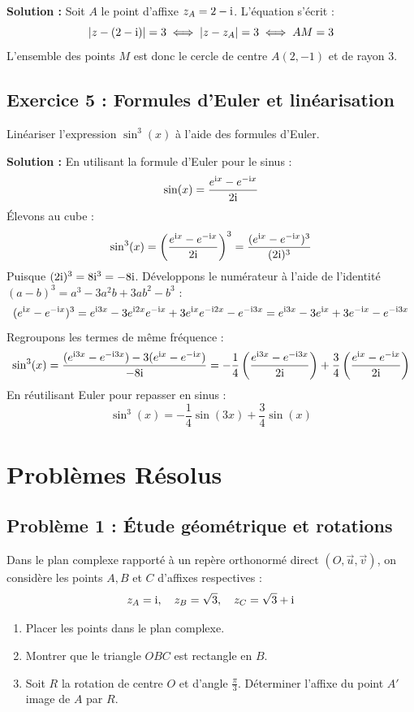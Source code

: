 \textbf{Solution :}
Soit $A$ le point d'affixe $z_A = 2 - \mathrm{i}$.
L'équation s'écrit :
\[
|z - (2 - \mathrm{i})| = 3 \iff |z - z_A| = 3 \iff AM = 3
\]
L'ensemble des points $M$ est donc le cercle de centre $A(2, -1)$ et de rayon 3.

\subsection*{Exercice 5 : Formules d'Euler et linéarisation}
Linéariser l'expression $\sin^3(x)$ à l'aide des formules d'Euler.

\textbf{Solution :}
En utilisant la formule d'Euler pour le sinus :
\[
\sin(x) = \frac{e^{\mathrm{i} x} - e^{-\mathrm{i} x}}{2\mathrm{i}}
\]
Élevons au cube :
\[
\sin^3(x) = \left(\frac{e^{\mathrm{i} x} - e^{-\mathrm{i} x}}{2\mathrm{i}}\right)^3 = \frac{(e^{\mathrm{i} x} - e^{-\mathrm{i} x})^3}{(2\mathrm{i})^3}
\]
Puisque $(2\mathrm{i})^3 = 8\mathrm{i}^3 = -8\mathrm{i}$. Développons le numérateur à l'aide de l'identité $(a-b)^3 = a^3 - 3a^2b + 3ab^2 - b^3$ :
\[
(e^{\mathrm{i} x} - e^{-\mathrm{i} x})^3 = e^{\mathrm{i} 3x} - 3e^{\mathrm{i} 2x}e^{-\mathrm{i} x} + 3e^{\mathrm{i} x}e^{-\mathrm{i} 2x} - e^{-\mathrm{i} 3x} = e^{\mathrm{i} 3x} - 3e^{\mathrm{i} x} + 3e^{-\mathrm{i} x} - e^{-\mathrm{i} 3x}
\]
Regroupons les termes de même fréquence :
\[
\sin^3(x) = \frac{(e^{\mathrm{i} 3x} - e^{-\mathrm{i} 3x}) - 3(e^{\mathrm{i} x} - e^{-\mathrm{i} x})}{-8\mathrm{i}} = -\frac{1}{4} \left( \frac{e^{\mathrm{i} 3x} - e^{-\mathrm{i} 3x}}{2\mathrm{i}} \right) + \frac{3}{4} \left( \frac{e^{\mathrm{i} x} - e^{-\mathrm{i} x}}{2\mathrm{i}} \right)
\]
En réutilisant Euler pour repasser en sinus :
\[
\sin^3(x) = -\frac{1}{4}\sin(3x) + \frac{3}{4}\sin(x)
\]

\section{Problèmes Résolus}

\subsection*{Problème 1 : Étude géométrique et rotations}
Dans le plan complexe rapporté à un repère orthonormé direct $(O, \vec{u}, \vec{v})$, on considère les points $A, B$ et $C$ d'affixes respectives :
\[
z_A = \mathrm{i}, \quad z_B = \sqrt{3}, \quad z_C = \sqrt{3} + \mathrm{i}
\]
\begin{enumerate}
    \item Placer les points dans le plan complexe.
    \item Montrer que le triangle $OBC$ est rectangle en $B$.
    \item Soit $R$ la rotation de centre $O$ et d'angle $\frac{\pi}{3}$. Déterminer l'affixe du point $A'$ image de $A$ par $R$.
\end{enumerate}

